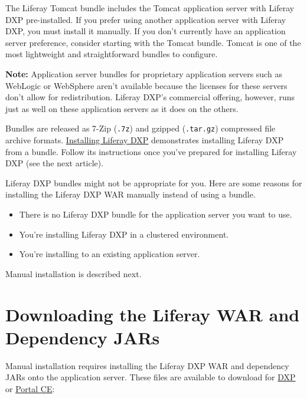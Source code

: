 The Liferay Tomcat bundle includes the Tomcat application server with
Liferay DXP pre-installed. If you prefer using another application
server with Liferay DXP, you must install it manually. If you don't
currently have an application server preference, consider starting with
the Tomcat bundle. Tomcat is one of the most lightweight and
straightforward bundles to configure.

\noindent\hrulefill

\textbf{Note:} Application server bundles for proprietary application
servers such as WebLogic or WebSphere aren't available because the
licenses for these servers don't allow for redistribution. Liferay DXP's
commercial offering, however, runs just as well on these application
servers as it does on the others.

\noindent\hrulefill

Bundles are released as 7-Zip (\texttt{.7z}) and gzipped
(\texttt{.tar.gz}) compressed file archive formats.
\href{/docs/7-2/deploy/-/knowledge_base/d/installing-product}{Installing
Liferay DXP} demonstrates installing Liferay DXP from a bundle. Follow
its instructions once you've prepared for installing Liferay DXP (see
the next article).

Liferay DXP bundles might not be appropriate for you. Here are some
reasons for installing the Liferay DXP WAR manually instead of using a
bundle.

\begin{itemize}
\item
  There is no Liferay DXP bundle for the application server you want to
  use.
\item
  You're installing Liferay DXP in a clustered environment.
\item
  You're installing to an existing application server.
\end{itemize}

Manual installation is described next.

\section{Downloading the Liferay WAR and Dependency
JARs}\label{downloading-the-liferay-war-and-dependency-jars}

Manual installation requires installing the Liferay DXP WAR and
dependency JARs onto the application server. These files are available
to download for \href{https://customer.liferay.com/downloads}{DXP} or
\href{https://www.liferay.com/downloads-community}{Portal CE}:

